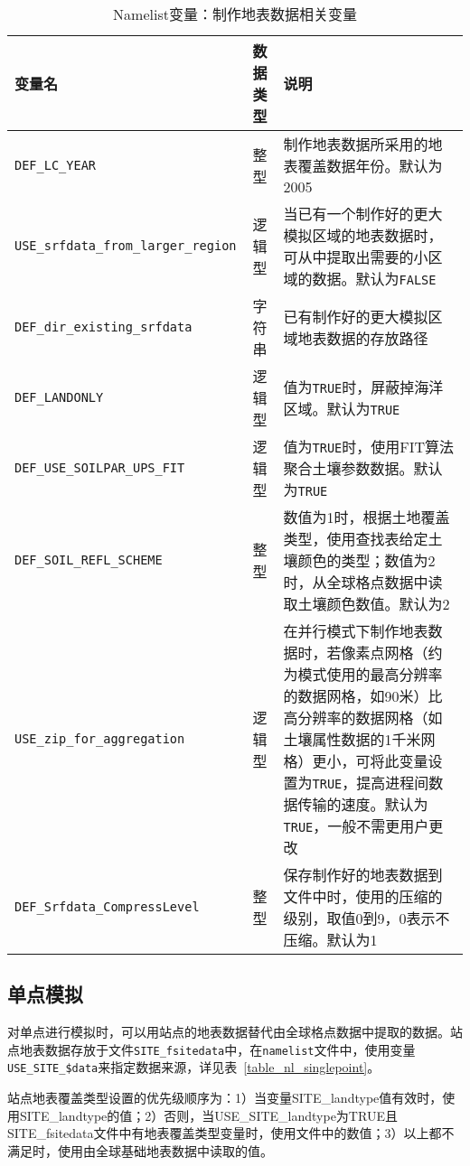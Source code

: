 \begin{table}[!htbp] \small
\caption{Namelist变量：制作地表数据相关变量} \label{table_nl_mksrfdata}
\centering \renewcommand{\arraystretch}{1.2}
\begin{tabular}{lcp{}}
\toprule
\textbf{变量名} & \textbf{数据类型} & \textbf{说明} \\\midrule
\texttt{DEF\_LC\_YEAR} & 整型 & 制作地表数据所采用的地表覆盖数据年份。默认为2005\\
\texttt{USE\_srfdata\_from\_larger\_region} & 逻辑型 & 当已有一个制作好的更大模拟区域的地表数据时，可从中提取出需要的小区域的数据。默认为\texttt{FALSE} \\
\texttt{DEF\_dir\_existing\_srfdata} & 字符串 & 已有制作好的更大模拟区域地表数据的存放路径 \\
\texttt{DEF\_LANDONLY} & 逻辑型 & 值为\texttt{TRUE}时，屏蔽掉海洋区域。默认为\texttt{TRUE} \\
\texttt{DEF\_USE\_SOILPAR\_UPS\_FIT} & 逻辑型 & 值为\texttt{TRUE}时，使用FIT算法聚合土壤参数数据。默认为\texttt{TRUE} \\
\texttt{DEF\_SOIL\_REFL\_SCHEME} & 整型 & 数值为1时，根据土地覆盖类型，使用查找表给定土壤颜色的类型；数值为2时，从全球格点数据中读取土壤颜色数值。默认为2\\
\texttt{USE\_zip\_for\_aggregation} & 逻辑型 & 在并行模式下制作地表数据时，若像素点网格（约为模式使用的最高分辨率的数据网格，如90米）比高分辨率的数据网格（如土壤属性数据的1千米网格）更小，可将此变量设置为\texttt{TRUE}，提高进程间数据传输的速度。默认为\texttt{TRUE}，一般不需更用户更改 \\
\texttt{DEF\_Srfdata\_CompressLevel} & 整型 & 保存制作好的地表数据到文件中时，使用的压缩的级别，取值0到9，0表示不压缩。默认为1\\
\bottomrule
\end{tabular}
\end{table}



\subsection{单点模拟}

对单点进行模拟时，可以用站点的地表数据替代由全球格点数据中提取的数据。站点地表数据存放于文件\texttt{SITE\_fsitedata}中，在\texttt{namelist}文件中，使用变量\texttt{USE\_SITE\_\allowbreak\$data}来指定数据来源，详见表~\ref{table_nl_singlepoint}。

站点地表覆盖类型设置的优先级顺序为：1）当变量SITE\_landtype值有效时，使用SITE\_landtype的值；2）否则，当USE\_SITE\_landtype为TRUE且SITE\_fsitedata文件中有地表覆盖类型变量时，使用文件中的数值；3）以上都不满足时，使用由全球基础地表数据中读取的值。

